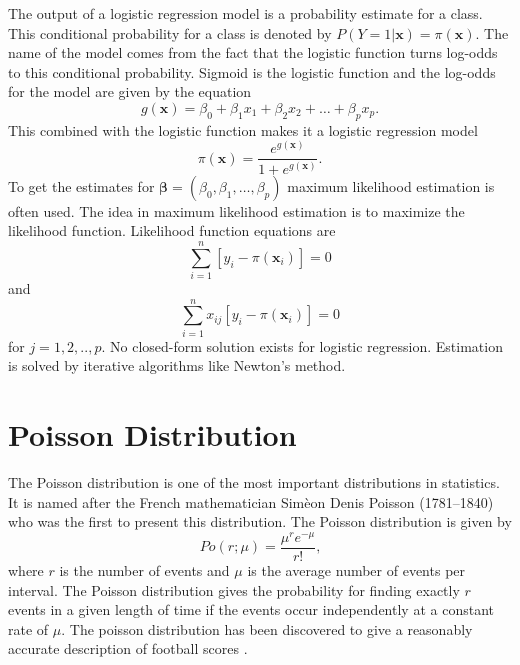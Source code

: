 The output of a logistic regression model is a probability estimate for a class. This conditional probability for a class is denoted by $P ( Y = 1 | \mathbf { x } ) = \pi ( \mathbf { x } )$. The name of the model comes from the fact that the logistic function turns log-odds to this conditional probability. Sigmoid is the logistic function and the log-odds for the model are given by the equation
\begin{equation}
    g ( \mathbf { x } ) = \beta _ { 0 } + \beta _ { 1 } x _ { 1 } + \beta _ { 2 } x _ { 2 } + \ldots + \beta _ { p } x _ { p }.
\end{equation}
This combined with the logistic function makes it a logistic regression model
\begin{equation}
    \pi ( \mathbf { x } ) = \frac { e ^ { g ( \mathbf { x } ) } } { 1 + e ^ { g ( \mathbf { x } ) } }.
\end{equation}
To get the estimates for $\boldsymbol { \beta } = \left( \beta _ { 0 } , \beta _ { 1 } , \ldots , \beta _ { p } \right)$ maximum likelihood estimation is often used. The idea in maximum likelihood estimation is to maximize the likelihood function. Likelihood function equations are
\begin{equation}
    \sum _ { i = 1 } ^ { n } \left[ y _ { i } - \pi \left( \mathbf { x } _ { i } \right) \right] = 0
\end{equation}
and
\begin{equation}
    \sum _ { i = 1 } ^ { n } x _ { i j } \left[ y _ { i } - \pi \left( \mathbf { x } _ { i } \right) \right] = 0
\end{equation}
for $j=1,2,..,p$. \cite{hosmer2013applied} No closed-form solution exists for logistic regression. Estimation is solved by iterative algorithms like Newton's method.

\section{Poisson Distribution}
The Poisson distribution is one of the most important distributions in statistics. It is named after the French mathematician Simèon Denis Poisson (1781–1840) who was the first to present this distribution. The Poisson distribution is given by
\begin{equation}
    Po ( r ; \mu ) = \frac { \mu ^ { r } e ^ { - \mu } } { r ! } \text{,}
\end{equation}
where $r$ is the number of events and $\mu$ is the average number of events per interval. The Poisson distribution gives the probability for finding exactly $r$ events in a given length of time if the events occur independently at a constant rate of $\mu$. \cite{walck1996hand} The poisson distribution has been discovered to give a reasonably accurate description of football scores \cite{maher1982modelling}.

